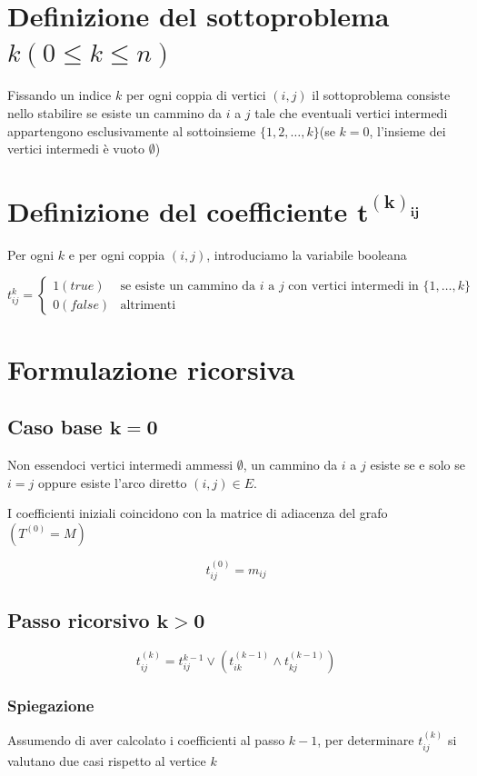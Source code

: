 \section{Definizione del sottoproblema $k(0 \leq k \leq n)$}
Fissando un indice $k$ per ogni coppia di vertici $(i,j)$ il sottoproblema consiste nello stabilire se esiste un cammino da $i$ a $j$ tale che eventuali vertici intermedi appartengono esclusivamente al sottoinsieme $\{1,2,\dots,k\}$(se $k=0$, l'insieme dei vertici intermedi è vuoto $\emptyset$)

\section{Definizione del coefficiente $\mathbf{t^{(k)_{ij}}}$}
Per ogni $k$ e per ogni coppia $(i,j)$, introduciamo la variabile booleana

{
    \large

    $$
    t^{k}_{ij} = 
    \begin{cases}
        1 (true) & \text{se esiste un cammino da $i$ a $j$ con vertici intermedi in $\{1,\dots,k\}$} \\
        0 (false) & \text{altrimenti}
    \end{cases}
    $$
}

\newpage
\section{Formulazione ricorsiva}
\subsection{Caso base $\mathbf{k=0}$}
Non essendoci vertici intermedi ammessi $\emptyset$, un cammino da $i$ a $j$ esiste se e solo se $i=j$ oppure esiste l'arco diretto $(i,j) \in E$.

I coefficienti iniziali coincidono con la matrice di adiacenza del grafo $(T^{(0)}=M)$

{
    \large

    $$
        t^{(0)}_{ij} = m_{ij}
    $$
}

\subsection{Passo ricorsivo $\mathbf{k>0}$}


{
    \large
    $$
    t_{ij}^{(k)} = t_{ij}^{k-1} \lor (t_{ik}^{(k-1)} \land t_{kj}^{(k-1)})
    $$
}

\subsubsection{Spiegazione}
Assumendo di aver calcolato i coefficienti al passo $k-1$, per determinare $t^{(k)}_{ij}$ si valutano due casi rispetto al vertice $k$

